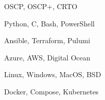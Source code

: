 \item[\textbf{Certifications}] OSCP, OSCP+, CRTO
\item[\textbf{Languages}] Python, C, Bash, PowerShell
\item[\textbf{Automation}] Ansible, Terraform, Pulumi
\item[\textbf{Cloud}] Azure, AWS, Digital Ocean
\item[\textbf{OS}] Linux, Windows, MacOS, BSD
\item[\textbf{Containers}] Docker, Compose, Kubernetes